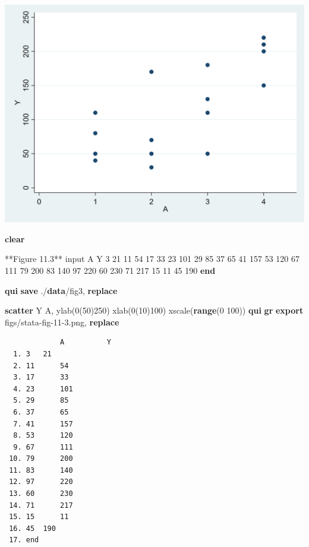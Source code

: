 \documentclass[
  10pt,
]{book}
\newenvironment{Shaded}{\begin{snugshade}}{\end{snugshade}}
\newcommand{\BaseNTok}[1]{\textcolor[rgb]{0.00,0.00,0.81}{#1}}
\newcommand{\KeywordTok}[1]{\textcolor[rgb]{0.13,0.29,0.53}{\textbf{#1}}}
\newcommand{\NormalTok}[1]{#1}
\begin{document}
\begin{center}\includegraphics[width=0.85\linewidth]{figs/stata-fig-11-2} \end{center}

\begin{Shaded}
\begin{Highlighting}[]
\KeywordTok{clear}

\NormalTok{**Figure 11.3**}
\NormalTok{input A Y}
\NormalTok{3   21  }
\NormalTok{11  54}
\NormalTok{17  33}
\NormalTok{23  101}
\NormalTok{29  85}
\NormalTok{37  65}
\NormalTok{41  157}
\NormalTok{53  120}
\NormalTok{67  111}
\NormalTok{79  200}
\NormalTok{83  140}
\NormalTok{97  220}
\NormalTok{60  230}
\NormalTok{71  217}
\NormalTok{15  11}
\NormalTok{45  190}
\KeywordTok{end}

\KeywordTok{qui} \KeywordTok{save}\NormalTok{ ./}\KeywordTok{data}\NormalTok{/fig3, }\KeywordTok{replace}

\KeywordTok{scatter}\NormalTok{ Y A, ylab(0(50)250) xlab(0(10)100) }\BaseNTok{xscale}\NormalTok{(}\KeywordTok{range}\NormalTok{(0 100))}
\KeywordTok{qui} \KeywordTok{gr} \KeywordTok{export}\NormalTok{ figs/stata{-}fig{-}11{-}3.png, }\KeywordTok{replace}
\end{Highlighting}
\end{Shaded}

\begin{verbatim}
             A          Y
  1. 3   21  
  2. 11      54
  3. 17      33
  4. 23      101
  5. 29      85
  6. 37      65
  7. 41      157
  8. 53      120
  9. 67      111
 10. 79      200
 11. 83      140
 12. 97      220
 13. 60      230
 14. 71      217
 15. 15      11
 16. 45  190
 17. end
\end{verbatim}
\end{document}
